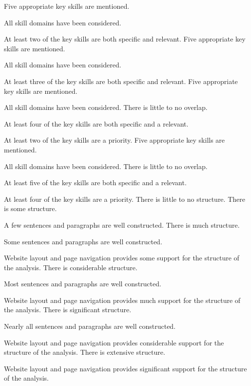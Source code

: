 \documentclass{../../fal_assignment}
\begin{document}
\begin{markingrubric}
        \grade 		Five appropriate key skills are mentioned.
        \par 		All skill domains have been considered.
        \par 		At least two of the key skills are both specific and relevant.
        \grade 		Five appropriate key skills are mentioned.
        \par 		All skill domains have been considered.
        \par 		At least three of the key skills are both specific and relevant.
        \grade 		Five appropriate key skills are mentioned.
        \par 		All skill domains have been considered. There is little to no overlap.
        \par 		At least four of the key skills are both specific and a relevant.
        \par 		At least two of the key skills are a priority.
        \grade 		Five appropriate key skills are mentioned.
        \par 		All skill domains have been considered. There is little to no overlap.
        \par 		At least five of the key skills are both specific and a relevant.
        \par 		At least four of the key skills are a priority.
%
        \grade\fail 	There is little to no structure.
        \grade 		There is some structure.
        \par 		A few sentences and paragraphs are well constructed.
        \grade 		There is much structure.
        \par 		Some sentences and paragraphs are well constructed.
        \par 		Website layout and page navigation provides some support for the structure of the analysis.
        \grade 		There is considerable structure.
        \par 		Most sentences and paragraphs are well constructed.
        \par 		Website layout and page navigation provides much support for the structure of the analysis.
        \grade 		There is significant structure.
        \par 		Nearly all sentences and paragraphs are well constructed.
        \par 		Website layout and page navigation provides considerable support for the structure of the analysis.
        \grade 		There is extensive structure.
        \par 		Website layout and page navigation provides significant support for the structure of the analysis.


\end{markingrubric}
\end{document}
